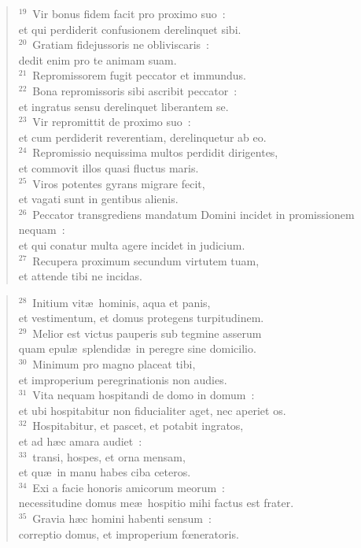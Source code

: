 \begin{verse}${}^{19}$~Vir bonus fidem facit pro proximo suo~:\\ et qui perdiderit confusionem derelinquet sibi.\\
${}^{20}$~Gratiam fidejussoris ne obliviscaris~:\\ dedit enim pro te animam suam.\\
${}^{21}$~Repromissorem fugit peccator et immundus.\\
${}^{22}$~Bona repromissoris sibi ascribit peccator~:\\ et ingratus sensu derelinquet liberantem se.\\
${}^{23}$~Vir repromittit de proximo suo~:\\ et cum perdiderit reverentiam, derelinquetur ab eo.\\
${}^{24}$~Repromissio nequissima multos perdidit dirigentes,\\ et commovit illos quasi fluctus maris.\\
${}^{25}$~Viros potentes gyrans migrare fecit,\\ et vagati sunt in gentibus alienis.\\
${}^{26}$~Peccator transgrediens mandatum Domini incidet in promissionem nequam~:\\ et qui conatur multa agere incidet in judicium.\\
${}^{27}$~Recupera proximum secundum virtutem tuam,\\ et attende tibi ne incidas.\end{verse}


\begin{verse}${}^{28}$~Initium vit\ae\ hominis, aqua et panis,\\ et vestimentum, et domus protegens turpitudinem.\\
${}^{29}$~Melior est victus pauperis sub tegmine asserum\\ quam epul\ae\ splendid\ae\ in peregre sine domicilio.\\
${}^{30}$~Minimum pro magno placeat tibi,\\ et improperium peregrinationis non audies.\\
${}^{31}$~Vita nequam hospitandi de domo in domum~:\\ et ubi hospitabitur non fiducialiter aget, nec aperiet os.\\
${}^{32}$~Hospitabitur, et pascet, et potabit ingratos,\\ et ad h\ae c amara audiet~:\\
${}^{33}$~transi, hospes, et orna mensam,\\ et qu\ae\ in manu habes ciba ceteros.\\
${}^{34}$~Exi a facie honoris amicorum meorum~:\\ necessitudine domus me\ae\ hospitio mihi factus est frater.\\
${}^{35}$~Gravia h\ae c homini habenti sensum~:\\ correptio domus, et improperium fœneratoris.\end{verse}


